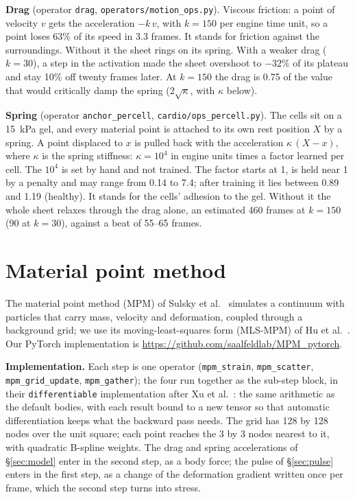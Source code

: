 \documentclass[10pt]{article}
\newcommand{\code}[1]{\texttt{#1}}
\begin{document}
\textbf{Drag} (operator \code{drag}, \code{operators/motion\_ops.py}). Viscous friction: a point of velocity $v$ gets
the acceleration $-k\,v$, with $k = 150$ per engine time unit, so a point loses 63\% of its speed in 3.3 frames. It
stands for friction against the surroundings. Without it the sheet rings on its spring. With a weaker drag ($k = 30$), a step in the activation made the sheet overshoot to $-32$\% of its plateau
and stay 10\% off twenty frames later. At $k = 150$ the drag is 0.75 of the value that would critically damp the
spring ($2\sqrt{\kappa}$, with $\kappa$ below).

\textbf{Spring} (operator \code{anchor\_percell}, \code{cardio/ops\_percell.py}). The cells sit on a 15~kPa gel,
and every material point is attached to its own rest position $X$ by a spring. A point displaced to $x$ is pulled
back with the acceleration $\kappa\,(X - x)$, where $\kappa$ is the spring stiffness: $\kappa = 10^4$ in engine units times a factor learned per cell. The
$10^4$ is set by hand and not trained. The factor starts at 1, is held near 1 by a penalty and may range from 0.14 to
7.4; after training it lies between 0.89 and 1.19 (healthy). It stands for the cells' adhesion to the gel. Without it the whole sheet
relaxes through the drag alone, an estimated 460 frames at $k = 150$ (90 at $k = 30$), against a beat of 55--65
frames.

\section{Material point method}\label{sec:mpm}

The material point method (MPM) of Sulsky et al.\ \cite{sulsky1994} simulates a continuum with particles that carry mass,
velocity and deformation, coupled through a background grid; we use its moving-least-squares form (MLS-MPM) of
Hu et al.\ \cite{hu2018}. Our PyTorch implementation is \url{https://github.com/saalfeldlab/MPM_pytorch}.

\textbf{Implementation.} Each step is one operator (\code{mpm\_strain}, \code{mpm\_scatter}, \code{mpm\_grid\_update},
\code{mpm\_gather}); the four run together as the sub-step block, in their \code{differentiable} implementation after
Xu et al.\ \cite{xu2025}: the same arithmetic as the default bodies, with each result bound to a new tensor so that
automatic differentiation keeps what the backward pass needs. The grid has 128 by 128 nodes over the unit square; each
point reaches the 3 by 3 nodes nearest to it, with quadratic B-spline weights. The drag and spring accelerations of
\S\ref{sec:model} enter in the second step, as a body force; the pulse of \S\ref{sec:pulse} enters in the first step, as
a change of the deformation gradient written once per frame, which the second step turns into stress.
\end{document}
